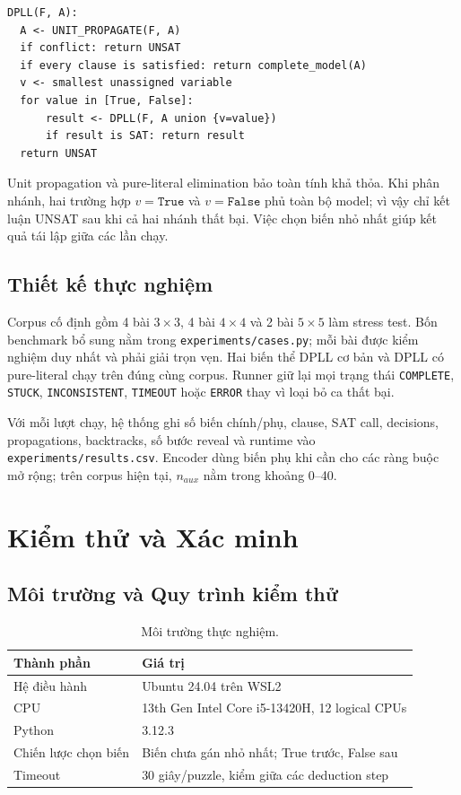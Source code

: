 \documentclass[11pt,a4paper]{report}
\begin{document}
\begin{lstlisting}[style=terminal]
DPLL(F, A):
  A <- UNIT_PROPAGATE(F, A)
  if conflict: return UNSAT
  if every clause is satisfied: return complete_model(A)
  v <- smallest unassigned variable
  for value in [True, False]:
      result <- DPLL(F, A union {v=value})
      if result is SAT: return result
  return UNSAT
\end{lstlisting}

Unit propagation và pure-literal elimination bảo toàn tính khả thỏa. Khi phân
nhánh, hai trường hợp $v=\texttt{True}$ và $v=\texttt{False}$ phủ toàn bộ model;
vì vậy chỉ kết luận UNSAT sau khi cả hai nhánh thất bại. Việc chọn biến nhỏ nhất
giúp kết quả tái lập giữa các lần chạy.

\section{Thiết kế thực nghiệm}
Corpus cố định gồm 4 bài $3\times3$, 4 bài $4\times4$ và 2 bài $5\times5$ làm
stress test. Bốn benchmark bổ sung nằm trong \texttt{experiments/cases.py}; mỗi
bài được kiểm nghiệm duy nhất và phải giải trọn vẹn. Hai biến thể DPLL cơ bản và
DPLL có pure-literal chạy trên đúng cùng corpus. Runner giữ lại mọi trạng thái
\texttt{COMPLETE}, \texttt{STUCK}, \texttt{INCONSISTENT}, \texttt{TIMEOUT} hoặc
\texttt{ERROR} thay vì loại bỏ ca thất bại.

Với mỗi lượt chạy, hệ thống ghi số biến chính/phụ, clause, SAT call, decisions,
propagations, backtracks, số bước reveal và runtime vào
\texttt{experiments/results.csv}. Encoder dùng biến phụ khi cần cho các ràng
buộc mở rộng; trên corpus hiện tại, $n_{aux}$ nằm trong khoảng 0--40.

\chapter{Kiểm thử và Xác minh}

\section{Môi trường và Quy trình kiểm thử}
\begin{table}[H]
\centering\footnotesize
\begin{tabularx}{\textwidth}{@{}p{4.4cm}Y@{}}
\toprule
\textbf{Thành phần} & \textbf{Giá trị}\\
\midrule
Hệ điều hành & Ubuntu 24.04 trên WSL2\\
CPU & 13th Gen Intel Core i5-13420H, 12 logical CPUs\\
Python & 3.12.3\\
Chiến lược chọn biến & Biến chưa gán nhỏ nhất; True trước, False sau\\
Timeout & 30 giây/puzzle, kiểm giữa các deduction step\\
\bottomrule
\end{tabularx}
\caption{Môi trường thực nghiệm.}
\end{table}
\end{document}

